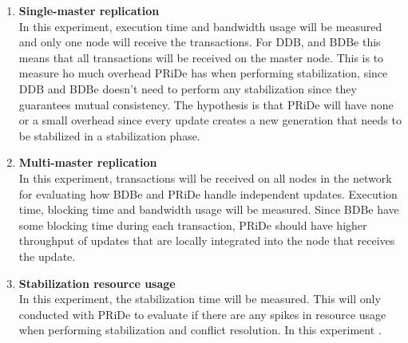 \begin{enumerate}

	\item \textbf{Single-master replication} \\ In this experiment, execution time and bandwidth usage will be measured and only one node will receive the transactions. For DDB, and BDBe this means that all transactions will be received on the master node. This is to measure ho much overhead PRiDe has when performing stabilization, since DDB and BDBe doesn't need to perform any stabilization since they guarantees mutual consistency. The hypothesis is that PRiDe will have none or a small overhead since every update creates a new generation that needs to be stabilized in a stabilization phase.
	
	\item \textbf{Multi-master replication} \\ In this experiment, transactions will be received on all nodes in the network for evaluating how BDBe and PRiDe handle independent updates. Execution time, blocking time and bandwidth usage will be measured. Since BDBe have some blocking time during each transaction, PRiDe should have higher throughput of updates that are locally integrated into the node that receives the update.  
	
	   
	\item \textbf{Stabilization resource usage} \\ In this experiment, the stabilization time will be measured. This will only conducted with PRiDe to evaluate if there are any spikes in resource usage when performing stabilization and conflict resolution. In this experiment .
	
	 
\end{enumerate}

